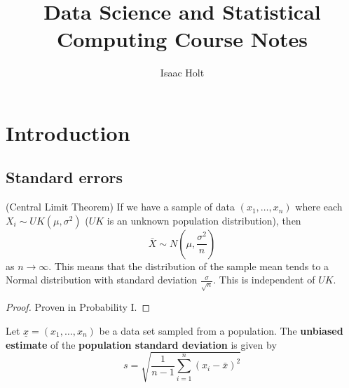 

\usepackage{listings}
\usepackage{xcolor}
\usepackage{bbm}



\lstset{style=mystyle}

\title{Data Science and Statistical Computing Course Notes}
\author{Isaac Holt}





\section{Introduction}

\subsection{Standard errors}

\begin{theorem}
	(Central Limit Theorem) If we have a sample of data $(x_1, \dots, x_n)$ where each $X_i \sim UK(\mu, \sigma^2)$ ($UK$ is an unknown population distribution), then
	\[
		\bar{X} \sim N\left(\mu, \frac{\sigma^2}{n}\right)
	\]
	as $n \rightarrow \infty$. This means that the distribution of the sample mean tends to a Normal distribution with standard deviation $\frac{\sigma}{\sqrt{n}}$. This is independent of $UK$.
\end{theorem}

\begin{proof}
	Proven in Probability I.
\end{proof}

\begin{definition}
	Let $\underline{x} = (x_1, \dots, x_n)$ be a data set sampled from a population. The \textbf{unbiased estimate} of the \textbf{population standard deviation} is given by
	\[
		s = \sqrt{\frac{1}{n - 1} \sum_{i = 1}^n {\left(x_i - \bar{x}\right)}^2}
	\]
\end{definition}

